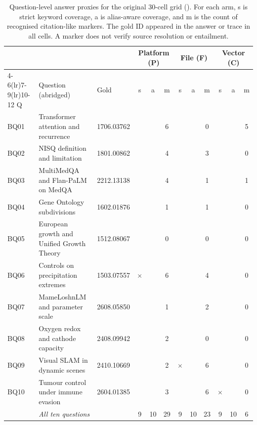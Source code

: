 \documentclass[final,5p,times,twocolumn]{elsarticle}
\newcommand{\yes}{\checkmark}\newcommand{\no}{--}
\begin{document}
\begin{table}[t]
\centering\small
\setlength{\tabcolsep}{3pt}
\caption{Question-level answer proxies for the original 30-cell grid
(\protect{}). For each arm, s is strict
keyword coverage, a is alias-aware coverage, and m is the count of recognised
citation-like markers. The gold ID appeared in the answer or trace in all
cells. A marker does not verify source resolution or entailment.}
\label{tab:s-answer-grid}
\begin{tabular}{@{}l>{\raggedright\arraybackslash}p{}l*{9}{c}@{}}
\toprule
 & & & \multicolumn{3}{c}{Platform (P)} & \multicolumn{3}{c}{File (F)} & \multicolumn{3}{c}{Vector (C)}\\
\cmidrule(lr){4-6}\cmidrule(lr){7-9}\cmidrule(lr){10-12}
Q & Question (abridged) & Gold & s & a & m & s & a & m & s & a & m\\
\midrule
BQ01 & Transformer attention and recurrence & 1706.03762 & \yes & \yes & 6 & \yes & \yes & 0 & \yes & \yes & 5\\
BQ02 & NISQ definition and limitation & 1801.00862 & \yes & \yes & 4 & \yes & \yes & 3 & \yes & \yes & 0\\
BQ03 & MultiMedQA and Flan-PaLM on MedQA & 2212.13138 & \yes & \yes & 4 & \yes & \yes & 1 & \yes & \yes & 1\\
BQ04 & Gene Ontology subdivisions & 1602.01876 & \yes & \yes & 1 & \yes & \yes & 1 & \yes & \yes & 0\\
BQ05 & European growth and Unified Growth Theory & 1512.08067 & \yes & \yes & 0 & \yes & \yes & 0 & \yes & \yes & 0\\
BQ06 & Controls on precipitation extremes & 1503.07557 & $\times$ & \yes & 6 & \yes & \yes & 4 & \yes & \yes & 0\\
BQ07 & MameLoshnLM and parameter scale & 2608.05850 & \yes & \yes & 1 & \yes & \yes & 2 & \yes & \yes & 0\\
BQ08 & Oxygen redox and cathode capacity & 2408.09942 & \yes & \yes & 2 & \yes & \yes & 0 & \yes & \yes & 0\\
BQ09 & Visual SLAM in dynamic scenes & 2410.10669 & \yes & \yes & 2 & $\times$ & \yes & 6 & \yes & \yes & 0\\
BQ10 & Tumour control under immune evasion & 2604.01385 & \yes & \yes & 3 & \yes & \yes & 6 & $\times$ & \yes & 0\\
\midrule
 & \emph{All ten questions} & & 9 & 10 & 29 & 9 & 10 & 23 & 9 & 10 & 6\\
\bottomrule
\end{tabular}
\end{table}
\end{document}
